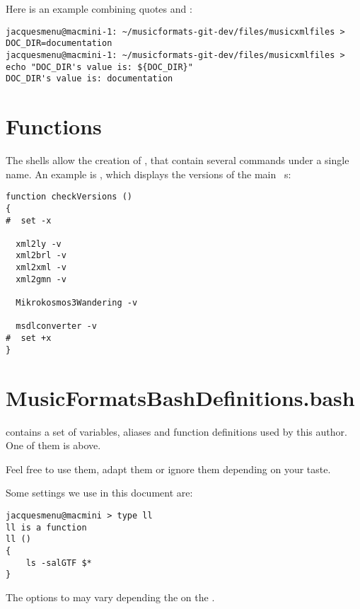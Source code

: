 Here is an example combining quotes and \doubleQuotes:
\begin{lstlisting}[language=Terminal]
jacquesmenu@macmini-1: ~/musicformats-git-dev/files/musicxmlfiles > DOC_DIR=documentation
jacquesmenu@macmini-1: ~/musicformats-git-dev/files/musicxmlfiles > echo "DOC_DIR's value is: ${DOC_DIR}"
DOC_DIR's value is: documentation
\end{lstlisting}


\section{Functions}

The shells allow the creation of , that contain several commands under a single name. An example is , which displays the versions of the main \mf\ \service s:
\begin{lstlisting}[language=Terminal]
function checkVersions ()
{
#  set -x

  xml2ly -v
  xml2brl -v
  xml2xml -v
  xml2gmn -v

  Mikrokosmos3Wandering -v

  msdlconverter -v
#  set +x
}
\end{lstlisting}


\section{MusicFormatsBashDefinitions.bash}

 contains a set of variables, aliases and function definitions used by this author. One of them is  above.

Feel free to use them, adapt them or ignore them depending on your taste.

Some settings we use in this document are:
\begin{lstlisting}[language=Terminal]
jacquesmenu@macmini > type ll
ll is a function
ll () 
{ 
    ls -salGTF $*
}
\end{lstlisting}
The options to  may vary depending the on the \OS.

